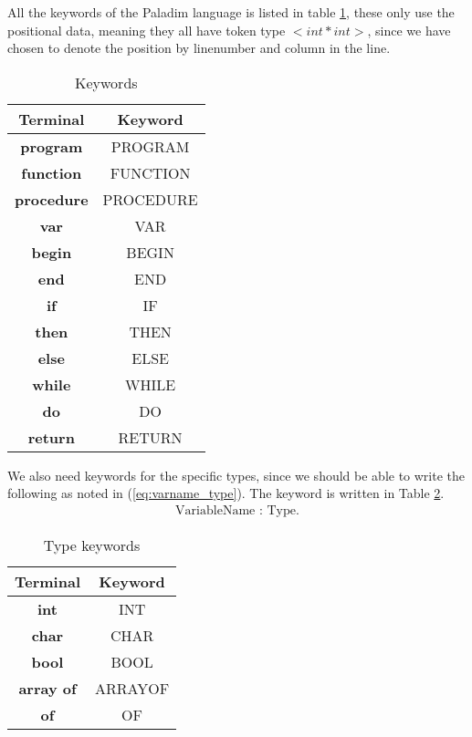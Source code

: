 \documentclass[10pt]{article}
\begin{document}
All the keywords of the Paladim language is listed in table \ref{tab:keywords}, these only use the positional data, meaning they all have token type $<int*int>$, since we have chosen to denote the position by linenumber and column in the line.

\begin{table}[h!]
\centering
\begin{tabular}{|c|c|}
\hline
Terminal & Keyword \\
\hline
\textbf{program} & PROGRAM \\
\textbf{function} & FUNCTION \\
\textbf{procedure} & PROCEDURE \\
\textbf{var} & VAR \\
\textbf{begin} & BEGIN \\
\textbf{end} & END \\
\textbf{if} & IF \\
\textbf{then} & THEN \\
\textbf{else} & ELSE \\
\textbf{while} & WHILE \\
\textbf{do} & DO \\
\textbf{return} & RETURN \\
\hline
\end{tabular}
\caption{\label{tab:keywords}Keywords}
\end{table}

We also need keywords for the specific types, since we should be able to write the following as noted in (\ref{eq:varname_type}). The keyword is written in Table \ref{tab:type_keywords}.
\begin{align}
\label{eq:varname_type}
\text{VariableName} \textbf{ : } \text{Type}. 
\end{align}

\begin{table}[h!]
\centering
\begin{tabular}{|c|c|}
\hline
Terminal & Keyword \\
\hline
\textbf{int} & INT \\
\textbf{char} & CHAR \\
\textbf{bool} & BOOL \\
\textbf{array of} & ARRAYOF \\
\textbf{of} & OF \\
\hline
\end{tabular}
\caption{\label{tab:type_keywords}Type keywords}
\end{table}
\end{document}
